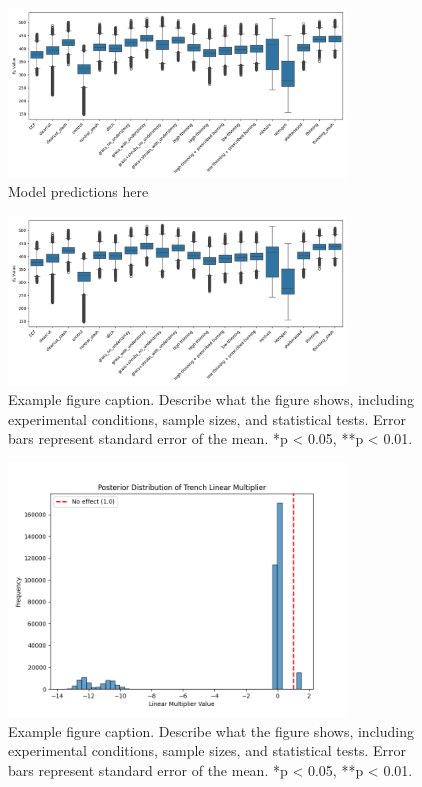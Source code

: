 \documentclass[12pt,a4paper]{article}
\begin{document}
\begin{figure}[H]
    \centering
    \includegraphics[width=0.8\textwidth]{"../ea_boxplot.png"}
    \caption{Model predictions here}
    \label{fig:model_fit}
\end{figure}

\begin{figure}[H]
    \centering
    \includegraphics[width=0.8\textwidth]{"../ea_boxplot.png"}
    \caption{Example figure caption. Describe what the figure shows, including experimental conditions, sample sizes, and statistical tests. Error bars represent standard error of the mean. *p < 0.05, **p < 0.01.}
    \label{fig:ea_boxplot}
\end{figure}

\begin{figure}[H]
    \centering
    \includegraphics[width=0.8\textwidth]{"../linear_multiplier.png"}
    \caption{Example figure caption. Describe what the figure shows, including experimental conditions, sample sizes, and statistical tests. Error bars represent standard error of the mean. *p < 0.05, **p < 0.01.}
    \label{fig:linear_mult}
\end{figure}
\end{document}
